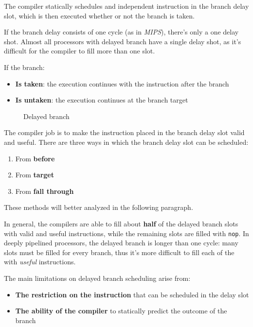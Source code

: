 \documentclass[english]{article}
\begin{document}
The compiler statically schedules and independent instruction in the branch delay slot, which is then executed whether or not the branch is taken.

If the branch delay consists of one cycle (as in \textit{MIPS}), there's only a one delay shot.
Almost all processors with delayed branch have a single delay shot, as it's difficult for the compiler to fill more than one slot.

If the branch:

\begin{itemize}
  \item \textbf{Is taken}: the execution continues with the instruction after the branch
  \item \textbf{Is untaken}: the execution continues at the branch target
\end{itemize}

\begin{figure}[htbp]
  \bigskip
  \centering
  \caption{Delayed branch}
  \label{fig:delayed-branch}
  \bigskip
\end{figure}

The compiler job is to make the instruction placed in the branch delay slot valid and useful.
There are three ways in which the branch delay slot can be scheduled:

\begin{enumerate}
  \item From \textbf{before}
  \item From \textbf{target}
  \item From \textbf{fall through}
\end{enumerate}

These methods will better analyzed in the following paragraph.

\bigskip
In general, the compilers are able to fill about \textbf{half} of the delayed branch slots with valid and useful instructions, while the remaining slots are filled with \texttt{nop}.
In deeply pipelined processors, the delayed branch is longer than one cycle: many slots must be filled for every branch, thus it's more difficult to fill each of the with \textit{useful} instructions.

The main limitations on delayed branch scheduling arise from:

\begin{itemize}
  \item \textbf{The restriction on the instruction} that can be scheduled in the delay slot
  \item \textbf{The ability of the compiler} to statically predict the outcome of the branch
\end{itemize}
\end{document}
